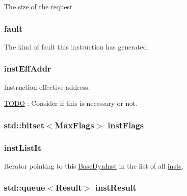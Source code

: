 \label{classBaseDynInst_ad52a4366d1b850793e6d979a7459cab4}
The size of the request \hypertarget{classBaseDynInst_a68714ceb74c60ea7ef5dec335bb6c5d7}{
\subsubsection[{fault}]{ {\bf fault}}}
\label{classBaseDynInst_a68714ceb74c60ea7ef5dec335bb6c5d7}
The kind of fault this instruction has generated. \hypertarget{classBaseDynInst_aaa54d2440fad0984a0a8edbcade8c26f}{
\subsubsection[{instEffAddr}]{ {\bf instEffAddr}}}
\label{classBaseDynInst_aaa54d2440fad0984a0a8edbcade8c26f}
Instruction effective address. \begin{Desc}
\item[\hyperlink{todo__todo000013}{TODO}]: Consider if this is necessary or not. \end{Desc}
\hypertarget{classBaseDynInst_a4bc909cbac3face1caf422952afdd400}{
\subsubsection[{instFlags}]{\setlength{\rightskip}{0pt plus 5cm}std::bitset$<$MaxFlags$>$ {\bf instFlags}}}
\label{classBaseDynInst_a4bc909cbac3face1caf422952afdd400}
\hypertarget{classBaseDynInst_ae774064514a3dc6a8d932c1fb975d37f}{
\subsubsection[{instListIt}]{ {\bf instListIt}}}
\label{classBaseDynInst_ae774064514a3dc6a8d932c1fb975d37f}
Iterator pointing to this \hyperlink{classBaseDynInst}{BaseDynInst} in the list of all \hyperlink{namespaceinsts}{insts}. \hypertarget{classBaseDynInst_a4ed9dfc2276eac05ce2f8a65849c2bf8}{
\subsubsection[{instResult}]{\setlength{\rightskip}{0pt plus 5cm}std::queue$<${\bf Result}$>$ {\bf instResult}}}
